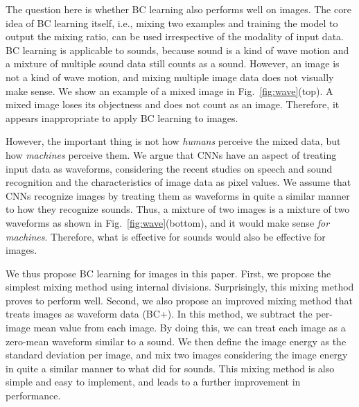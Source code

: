 \documentclass[10pt,twocolumn,letterpaper]{article}
\begin{document}
The question here is whether BC learning also performs well on images. The core idea of BC learning itself, i.e., mixing two examples and training the model to output the mixing ratio, can be used irrespective of the modality of input data. BC learning is applicable to sounds, because sound is a kind of wave motion and a mixture of multiple sound data still counts as a sound. However, an image is not a kind of wave motion, and mixing multiple image data does not visually make sense. We show an example of a mixed image in Fig.~\ref{fig:wave}(top). A mixed image loses its objectness and does not count as an image. Therefore, it appears inappropriate to apply BC learning to images.

However, the important thing is not how {\it humans} perceive the mixed data, but how {\it machines} perceive them. We argue that CNNs have an aspect of treating input data as waveforms, considering the recent studies on speech and sound recognition and the characteristics of image data as pixel values. We assume that CNNs recognize images by treating them as waveforms in quite a similar manner to how they recognize sounds. Thus, a mixture of two images is a mixture of two waveforms as shown in Fig.~\ref{fig:wave}(bottom), and it would make sense {\it for machines}. Therefore, what is effective for sounds would also be effective for images.

We thus propose BC learning for images in this paper. First, we propose the simplest mixing method using internal divisions. Surprisingly, this mixing method proves to perform well. Second, we also propose an improved mixing method that treats images as waveform data (BC+). In this method, we subtract the per-image mean value from each image. By doing this, we can treat each image as a zero-mean waveform similar to a sound. We then define the image energy as the standard deviation per image, and mix two images considering the image energy in quite a similar manner to what \cite{tokozume2018learning} did for sounds. This mixing method is also simple and easy to implement, and leads to a further improvement in performance.
\end{document}
